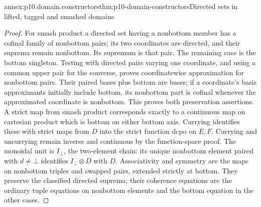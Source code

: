 \begin{annexitem}{annex:p10.domain.constructors}{thm:p10-domain-constructors}{Directed sets in lifted, tagged and smashed domains}
\begin{proof}
For smash product a directed set having a nonbottom member has a
cofinal family of nonbottom pairs; its two coordinates are directed,
and their suprema remain nonbottom. Its supremum is that pair.
The remaining case is the bottom singleton. Testing with directed
pairs varying one coordinate, and using a common upper pair for
the converse, proves coordinatewise approximation for nonbottom
pairs. Their paired bases plus bottom are bases; if a coordinate's
basis approximants initially include bottom, its nonbottom part
is cofinal whenever the approximated coordinate is nonbottom.
This proves both preservation assertions.
A strict map from smash product corresponds exactly to a
continuous map on cartesian product which is bottom on either
bottom axis. Currying identifies these with strict maps from
\(D\) into the strict function dcpo on \(E,F\). Currying and
uncurrying remain inverse and continuous by the function-space
proof. The monoidal unit is \(I_{\bot}\), the two-element chain:
its unique nonbottom element paired with \(d\ne\bot\) identifies
\(I_{\bot}\otimes D\) with \(D\). Associativity and symmetry
are the maps on nonbottom triples and swapped pairs, extended
strictly at bottom. They preserve the classified directed suprema;
their coherence equations are the ordinary tuple equations on
nonbottom elements and the bottom equation in the other cases.
\end{proof}
\end{annexitem}

